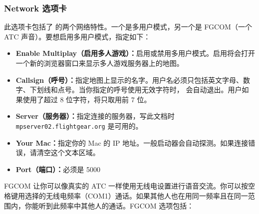 \ifchinese
\subsubsection{Network 选项卡}
此选项卡包括了 \FlightGear{} 的两个网络特性。一个是多用户模式，另一个是 FGCOM（一个 ATC 声音）。要想启用多用户模式，指定如下：
\begin{itemize}
\item \textbf{Enable Multiplay（启用多人游戏）：}启用或禁用多用户模式。启用将会打开一个新的浏览器窗口来显示多人游戏服务器上的地图。
\item \textbf{Callsign（呼号）：}指定地图上显示的名字。用户名必须只包括英文字母、数字、下划线和点号。当你指定的呼号使用无效字符时，\FlightGear{} 会自动退出。用户如果使用了超过 8 位字符，将只取用前 7 位。
\item \textbf{Server（服务器）：}指定连接的服务器，写此文档时 \texttt{mpserver02.flightgear.org} 是可用的。
\item \textbf{Your Mac：}指定你的 Mac 的 IP 地址。一般启动器会自动探测。如果连接错误，请清空这个文本区域。
\item \textbf{Port（端口）：}必须是 5000
\end{itemize}

FGCOM 让你可以像真实的 ATC 一样使用无线电设置进行语音交流。你可以按空格键用选择的无线电频率（COM1）通话。如果其他人也在用同一频率且在同一范围内，你能听到此频率中其他人的通话。FGCOM 选项包括：

